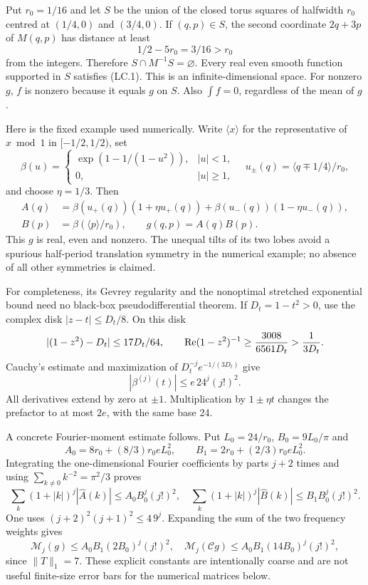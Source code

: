 Put \(r_0=1/16\) and let \(S\) be the union of the closed torus squares of halfwidth \(r_0\) centred at \((1/4,0)\) and \((3/4,0)\). If \((q,p)\in S\), the second coordinate \(2q+3p\) of \(M(q,p)\) has distance at least \[
 1/2-5r_0=3/16>r_0                                          \tag{LC.13}
\] from the integers. Therefore \(S\cap M^{-1}S=\varnothing\). Every real even smooth function supported in \(S\) satisfies (LC.1). This is an infinite-dimensional space. For nonzero \(g\), \(f\) is nonzero because it equals \(g\) on \(S\). Also \(\int f=0\), regardless of the mean of \(g\).

Here is the fixed example used numerically. Write \(\langle x\rangle\) for the representative of \(x\bmod1\) in \([-1/2,1/2)\), set \[
 \beta(u)=\begin{cases}\exp(1-1/(1-u^2)),&|u|<1,\\0,&|u|\geq1,\end{cases}
 \quad u_\pm(q)=\langle q\mp1/4\rangle/r_0,
\] and choose \(\eta=1/3\). Then \[
 \begin{split}
 A(q)&=\beta(u_+(q))(1+\eta u_+(q))
                +\beta(u_-(q))(1-\eta u_-(q)),\\
 B(p)&=\beta(\langle p\rangle/r_0),\qquad g(q,p)=A(q)B(p).
 \end{split}                                                \tag{LC.14}
\] This \(g\) is real, even and nonzero. The unequal tilts of its two lobes avoid a spurious half-period translation symmetry in the numerical example; no absence of all other symmetries is claimed.

For completeness, its Gevrey regularity and the nonoptimal stretched exponential bound need no black-box pseudodifferential theorem. If \(D_t=1-t^2>0\), use the complex disk \(|z-t|\leq D_t/8\). On this disk \[
 |(1-z^2)-D_t|\leq17D_t/64,\qquad
 \mathop{\rm Re}(1-z^2)^{-1}\geq\frac{3008}{6561D_t}>
 \frac1{3D_t}.
\] Cauchy's estimate and maximization of \(D_t^{-j}e^{-1/(3D_t)}\) give \[
 |\beta^{(j)}(t)|\leq e\,24^j(j!)^2.                         \tag{LC.15}
\] All derivatives extend by zero at \(\pm1\). Multiplication by \(1\pm\eta t\) changes the prefactor to at most \(2e\), with the same base 24.

A concrete Fourier-moment estimate follows. Put \(L_0=24/r_0\), \(B_0=9L_0/\pi\) and \[
 A_0=8r_0+(8/3)r_0eL_0^2,\qquad
 B_1=2r_0+(2/3)r_0eL_0^2.
\] Integrating the one-dimensional Fourier coefficients by parts \(j+2\) times and using \(\sum_{k\ne0}k^{-2}=\pi^2/3\) proves \[
 \sum_k(1+|k|)^j|\widehat A(k)|\leq A_0B_0^j(j!)^2,
 \quad
 \sum_k(1+|k|)^j|\widehat B(k)|\leq B_1B_0^j(j!)^2.           \tag{LC.16}
\] One uses \((j+2)^2(j+1)^2\leq4\,9^j\). Expanding the sum of the two frequency weights gives \[
 \mathcal M_j(g)\leq A_0B_1(2B_0)^j(j!)^2,
 \quad
 \mathcal M_j(\mathcal Cg)\leq A_0B_1(14B_0)^j(j!)^2,        \tag{LC.17}
\] since \(\|T\|_1=7\). These explicit constants are intentionally coarse and are not useful finite-size error bars for the numerical matrices below.


